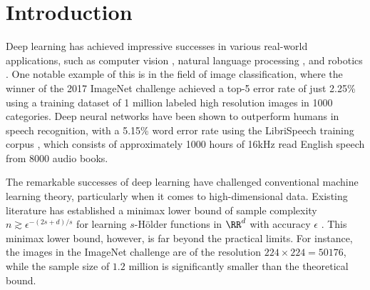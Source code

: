 \section{Introduction}

Deep learning has achieved impressive successes in various real-world applications, such as computer vision \citep{krizhevsky2012imagenet, goodfellow2014generative, Long_2015_CVPR}, natural language processing \citep{graves2013speech, bahdanau2014neural, young2018recent}, and robotics \citep{gu2017deep}. One notable example of this is in the field of image classification, where the winner of the 2017 ImageNet challenge achieved a top-5 error rate of just 2.25\% \citep{hu2018squeeze} using a training dataset of 1 million labeled high resolution images in 1000 categories. Deep neural networks have been shown to outperform humans in speech recognition, with a 5.15\% word error rate using the LibriSpeech training corpus \citep{panayotov2015librispeech}, which consists of approximately 1000 hours of 16kHz read English speech from 8000 audio books.

The remarkable successes of deep learning have challenged conventional machine learning theory, particularly when it comes to high-dimensional data. Existing literature has established a minimax lower bound of sample complexity $n\gtrsim\epsilon^{-(2s+d)/s}$ for learning $s$-H\"{o}lder functions in $\RR^d$ with accuracy $\epsilon$ \citep{gyorfi2006distribution}. 
This minimax lower bound, however, is far beyond the practical limits. For instance, the images in the ImageNet challenge are of the resolution $224\times224=50176$, while the sample size of $1.2$ million is significantly smaller than the theoretical bound.




